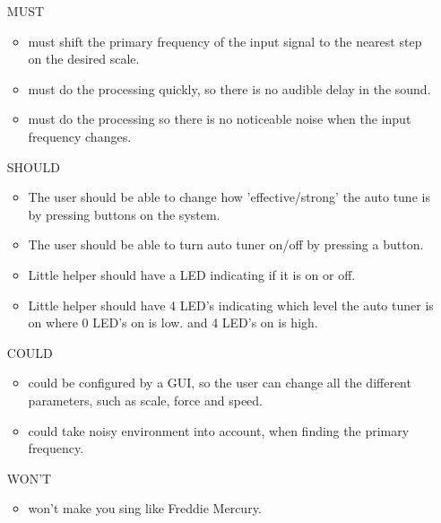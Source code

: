 \begin{itemize}
	\item[MUST] ~
	\begin{itemize}
		\item \systemName must shift the primary frequency of the input signal to the nearest step on the desired scale.
		\item \systemName must do the processing quickly, so there is no audible delay in the sound.
		\item \systemName must do the processing so there is no noticeable noise when the input frequency changes.
	\end{itemize}
	\item[SHOULD] ~
	\begin{itemize}
		\item The user should be able to change how 'effective/strong' the auto tune is by pressing buttons on the system.
		\item The user should be able to turn auto tuner on/off by pressing a button.
		\item Little helper should have a LED indicating if it is on or off.
		\item Little helper should have 4 LED's indicating which level the auto tuner is on where 0 LED's on is low. and 4 LED's on is high.
	\end{itemize}
	\item[COULD] ~
	\begin{itemize}
		\item \systemName could be configured by a GUI, so the user can change all the different parameters, such as scale, force and speed.
		\item \systemName could take noisy environment into account, when finding the primary frequency.
	\end{itemize}
	\item[WON'T] ~
	\begin{itemize}
		\item \systemName won't make you sing like Freddie Mercury.
	\end{itemize}
\end{itemize}

